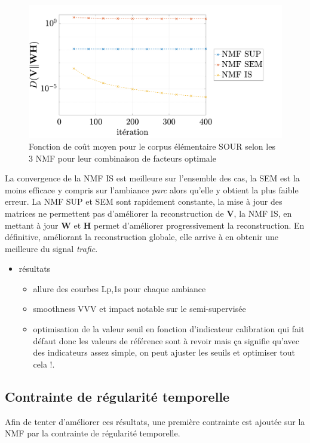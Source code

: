 \begin{figure}[h]
\centering
\includegraphics[width=.8\linewidth]{./figures/resultats/grafic_cost.pdf}
\caption{Fonction de coût moyen pour le corpus élémentaire SOUR selon les 3 NMF pour leur combinaison de facteurs optimale}
\end{figure}


La convergence de la NMF IS est meilleure sur l'ensemble des cas, la SEM est la moins efficace y compris sur l'ambiance \textit{parc} alors qu'elle y obtient la plus faible erreur. La NMF SUP et SEM sont rapidement constante, la mise à jour des matrices ne permettent pas d'améliorer la reconstruction de $\mathbf{V}$, la NMF IS, en mettant à jour $\mathbf{W}$ et $\mathbf{H}$ permet d'améliorer progressivement la reconstruction. En définitive, améliorant la reconstruction globale, elle arrive à en obtenir une meilleure du signal \textit{trafic}.



\begin{itemize}
\item résultats
\begin{itemize}
\item allure des courbes Lp,1s pour chaque ambiance

\item smoothness VVV et impact notable sur le semi-supervisée
\item optimisation de la valeur seuil en fonction d'indicateur
calibration qui fait défaut donc les valeurs de référence sont à revoir mais ça signifie qu'avec des indicateurs assez simple, on peut ajuster les seuils et optimiser tout cela !.
\end{itemize}
\end{itemize}




\subsection{Contrainte de régularité temporelle}
Afin de tenter d'améliorer ces résultats, une première contrainte est ajoutée sur la NMF par la contrainte de régularité temporelle. 


